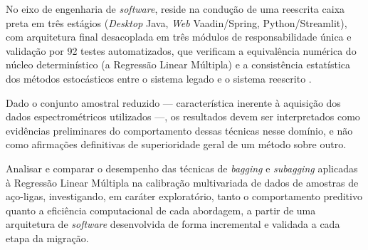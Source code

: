 No eixo de engenharia de \textit{software}, reside na condução de uma reescrita caixa preta em três estágios (\textit{Desktop} Java, \textit{Web} Vaadin/Spring, Python/Streamlit), com arquitetura final desacoplada em três módulos de responsabilidade única e validação por 92 testes automatizados, que verificam a equivalência numérica do núcleo determinístico (a Regressão Linear Múltipla) e a consistência estatística dos métodos estocásticos entre o sistema legado e o sistema reescrito \cite{streamlit_main_2026,streamlit_docs_2026}.


Dado o conjunto amostral reduzido — característica inerente à aquisição dos dados espectrométricos utilizados —, os resultados devem ser interpretados como evidências preliminares do comportamento dessas técnicas nesse domínio, e não como afirmações definitivas de superioridade geral de um método sobre outro.

Analisar e comparar o desempenho das técnicas de \textit{bagging} e \textit{subagging} aplicadas à Regressão Linear Múltipla na calibração multivariada de dados de amostras de aço-ligas, investigando, em caráter exploratório, tanto o comportamento preditivo quanto a eficiência computacional de cada abordagem, a partir de uma arquitetura de \textit{software} desenvolvida de forma incremental e validada a cada etapa da migração.

